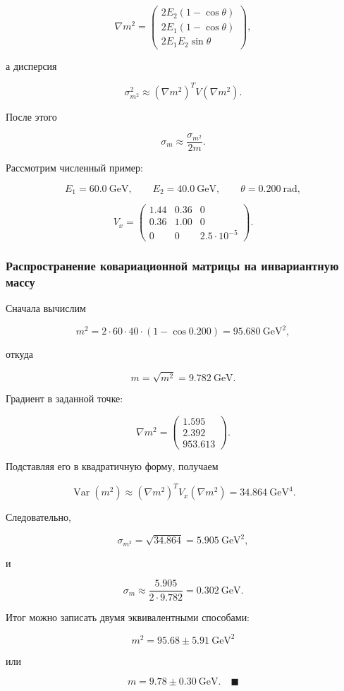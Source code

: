 \documentclass[
  russian,
  12pt,
  a4paper,
  a4paper,
  openany]{scrbook}
\begin{document}
\[
\nabla m^2
=
\begin{pmatrix}
2E_2(1-\cos\theta)\\
2E_1(1-\cos\theta)\\
2E_1E_2\sin\theta
\end{pmatrix},
\]

а дисперсия

\[
\sigma_{m^2}^2
\approx
(\nabla m^2)^TV(\nabla m^2).
\]

После этого

\[
\sigma_m\approx\frac{\sigma_{m^2}}{2m}.
\]

Рассмотрим численный пример:

\[
E_1=60.0~\mathrm{GeV},
\qquad
E_2=40.0~\mathrm{GeV},
\qquad
\theta=0.200~\mathrm{rad},
\]

\[
V_x=
\begin{pmatrix}
1.44&0.36&0\\
0.36&1.00&0\\
0&0&2.5\cdot10^{-5}
\end{pmatrix}.
\]

\begin{bookderivation}

\subsubsection{Распространение ковариационной матрицы на инвариантную
массу}\label{ux440ux430ux441ux43fux440ux43eux441ux442ux440ux430ux43dux435ux43dux438ux435-ux43aux43eux432ux430ux440ux438ux430ux446ux438ux43eux43dux43dux43eux439-ux43cux430ux442ux440ux438ux446ux44b-ux43dux430-ux438ux43dux432ux430ux440ux438ux430ux43dux442ux43dux443ux44e-ux43cux430ux441ux441ux443}

Сначала вычислим

\[
m^2
=2\cdot60\cdot40\cdot(1-\cos0.200)
=95.680~\mathrm{GeV}^2,
\]

откуда

\[
m=\sqrt{m^2}=9.782~\mathrm{GeV}.
\]

Градиент в заданной точке:

\[
\nabla m^2
=
\begin{pmatrix}
1.595\\
2.392\\
953.613
\end{pmatrix}.
\]

Подставляя его в квадратичную форму, получаем

\[
\operatorname{Var}(m^2)
\approx
(\nabla m^2)^TV_x(\nabla m^2)
=34.864~\mathrm{GeV}^4.
\]

Следовательно,

\[
\sigma_{m^2}
=\sqrt{34.864}
=5.905~\mathrm{GeV}^2,
\]

и

\[
\sigma_m
\approx
\frac{5.905}{2\cdot9.782}
=0.302~\mathrm{GeV}.
\]

Итог можно записать двумя эквивалентными способами:

\[
\boxed{
m^2=95.68\pm5.91~\mathrm{GeV}^2
}
\]

или

\[
\boxed{
m=9.78\pm0.30~\mathrm{GeV}.
}
\quad\blacksquare
\]

\end{bookderivation}
\end{document}
